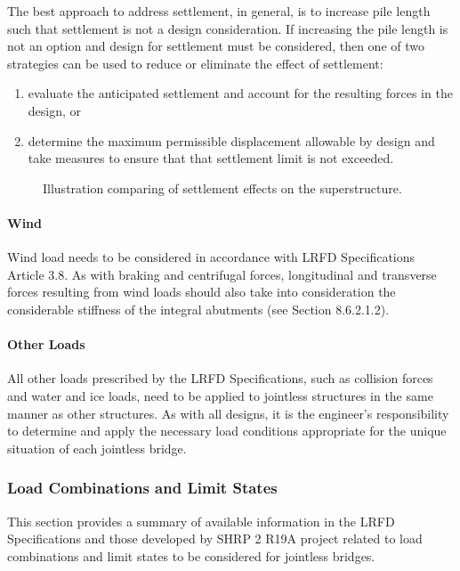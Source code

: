 The best approach to address settlement, in general, is to increase pile length such that settlement is not a design
consideration. If increasing the pile length is not an option and design for settlement must be considered, then one of
two strategies can be used to reduce or eliminate the effect of settlement: 
\begin{enumerate}
  \item evaluate the anticipated settlement and account for the resulting forces in the design, or 
  \item determine the maximum permissible displacement allowable by design and take measures to ensure that that settlement limit is not exceeded.
\end{enumerate} 

\begin{figure}
  \caption{Illustration comparing of settlement effects on the superstructure.}
  \label{fig:settlement-effects}
\end{figure}

\paragraph{Wind}
Wind load needs to be considered in accordance with LRFD Specifications Article 3.8. As with braking and
centrifugal forces, longitudinal and transverse forces resulting from wind loads should also take into consideration the
considerable stiffness of the integral abutments (see Section 8.6.2.1.2).


\paragraph{Other Loads}
All other loads prescribed by the LRFD Specifications, such as collision forces and water and ice loads, need to be
applied to jointless structures in the same manner as other structures. As with all designs, it is the engineer’s
responsibility to determine and apply the necessary load conditions appropriate for the unique situation of each
jointless bridge.

\subsubsection{Load Combinations and Limit States}
This section provides a summary of available information in the LRFD Specifications and those developed by
SHRP 2 R19A project related to load combinations and limit states to be considered for jointless bridges.

